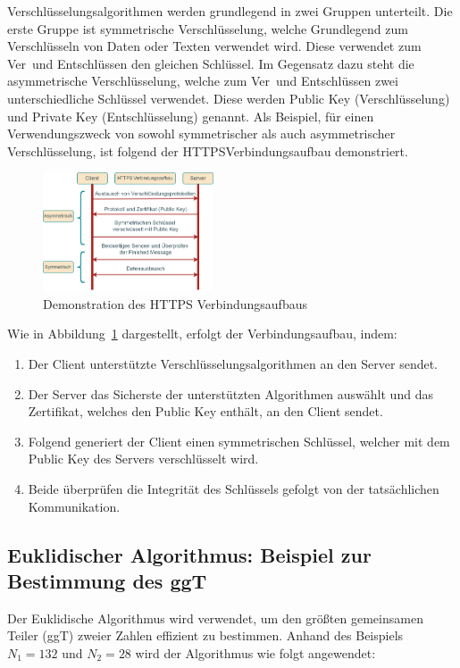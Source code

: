 
Verschlüsselungsalgorithmen werden grundlegend in zwei Gruppen unterteilt.
Die erste Gruppe ist symmetrische Verschlüsselung, welche Grundlegend zum Verschlüsseln von Daten
oder Texten verwendet wird. Diese verwendet zum Ver\textendash\ und Entschlüssen den gleichen Schlüssel.
Im Gegensatz dazu steht die asymmetrische Verschlüsselung, welche zum Ver\textendash\ und Entschlüssen
zwei unterschiedliche Schlüssel verwendet. Diese werden Public Key (Verschlüsselung) und 
Private Key (Entschlüsselung) genannt. Als Beispiel, für einen Verwendungszweck von sowohl symmetrischer als auch 
asymmetrischer Verschlüsselung, ist folgend der HTTPS\textendash Verbindungsaufbau demonstriert.
\begin{figure}[h!]
    \centering
    \includegraphics[width=0.45\textwidth]{sections/paul/https_verbindungsaufbau.drawio.png}
    \caption{Demonstration des HTTPS Verbindungsaufbaus}
    \label{fig:http_verbindungsaufbau}
\end{figure}
Wie in Abbildung~\ref{fig:http_verbindungsaufbau} dargestellt, erfolgt der Verbindungsaufbau, indem:
\begin{enumerate}
    \item Der Client unterstützte Verschlüsselungsalgorithmen an den Server sendet.
    \item Der Server das Sicherste der unterstützten Algorithmen auswählt und das Zertifikat, welches den Public Key enthält, an den Client sendet.
    \item Folgend generiert der Client einen symmetrischen Schlüssel, welcher mit dem Public Key des Servers verschlüsselt wird.
    \item Beide überprüfen die Integrität des Schlüssels gefolgt von der tatsächlichen Kommunikation.
\end{enumerate}

\subsection{Euklidischer Algorithmus: Beispiel zur Bestimmung des ggT}

Der Euklidische Algorithmus wird verwendet, um den größten gemeinsamen 
Teiler (ggT) zweier Zahlen effizient zu bestimmen. Anhand des Beispiels 
$N_1 = 132$ und $N_2 = 28$ wird der Algorithmus wie folgt angewendet:

